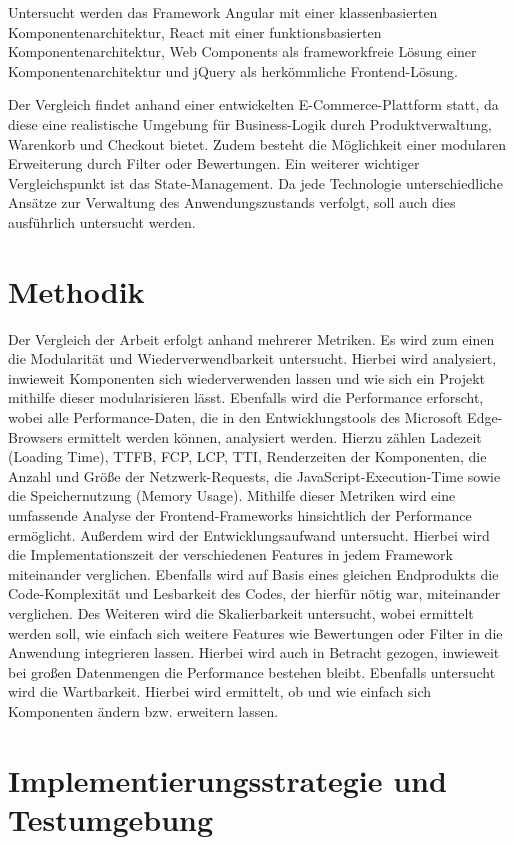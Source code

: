 \documentclass[oneside]{ausarbeitung}
\begin{document}
Untersucht werden das Framework Angular mit einer klassenbasierten Komponentenarchitektur, React mit einer funktionsbasierten Komponentenarchitektur, Web Components als frameworkfreie Lösung einer Komponentenarchitektur und jQuery als herkömmliche Frontend-Lösung.

Der Vergleich findet anhand einer entwickelten E-Commerce-Plattform statt, da diese eine realistische Umgebung für Business-Logik durch Produktverwaltung, Warenkorb und Checkout bietet. Zudem besteht die Möglichkeit einer modularen Erweiterung durch Filter oder Bewertungen. Ein weiterer wichtiger Vergleichspunkt ist das State-Management. Da jede Technologie unterschiedliche Ansätze zur Verwaltung des Anwendungszustands verfolgt, soll auch dies ausführlich untersucht werden.

\section{Methodik}
Der Vergleich der Arbeit erfolgt anhand mehrerer Metriken. Es wird zum einen die Modularität und Wiederverwendbarkeit untersucht. Hierbei wird analysiert, inwieweit Komponenten sich wiederverwenden lassen und wie sich ein Projekt mithilfe dieser modularisieren lässt. Ebenfalls  wird die Performance erforscht, wobei alle Performance-Daten, die in den Entwicklungstools des Microsoft Edge-Browsers ermittelt werden können, analysiert werden. Hierzu zählen Ladezeit (Loading Time), \ac{TTFB}, \ac{FCP}, \ac{LCP}, \ac{TTI}, Renderzeiten der Komponenten, die Anzahl und Größe der Netzwerk-Requests, die JavaScript-Execution-Time sowie die Speichernutzung (Memory Usage). Mithilfe dieser Metriken wird eine umfassende Analyse der Frontend-Frameworks hinsichtlich der Performance ermöglicht. Außerdem wird der Entwicklungsaufwand untersucht. Hierbei wird die Implementationszeit der verschiedenen Features in jedem Framework miteinander verglichen. Ebenfalls wird auf Basis eines gleichen Endprodukts die Code-Komplexität und Lesbarkeit des Codes, der hierfür nötig war, miteinander verglichen. Des Weiteren wird die Skalierbarkeit untersucht, wobei ermittelt werden soll, wie einfach sich weitere Features wie Bewertungen oder Filter in die Anwendung integrieren lassen. Hierbei wird auch in Betracht gezogen, inwieweit bei großen Datenmengen die Performance bestehen bleibt. Ebenfalls untersucht wird die Wartbarkeit. Hierbei wird ermittelt, ob und wie einfach sich Komponenten ändern bzw. erweitern lassen.  

\section{Implementierungsstrategie und Testumgebung}
\end{document}
